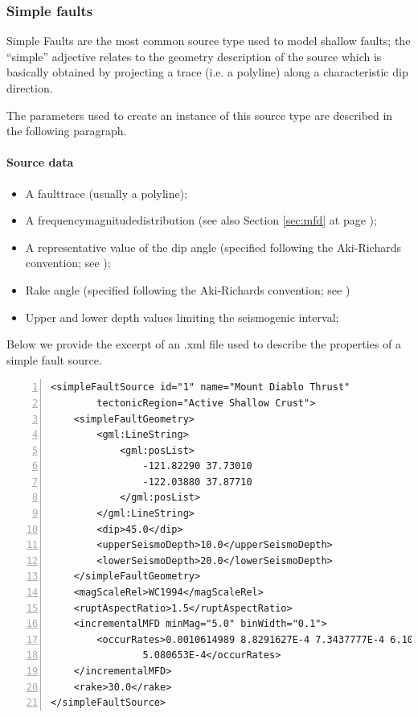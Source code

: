 \subsubsection{Simple faults}
%
Simple Faults are the most common source type used to model shallow 
faults; the ``simple'' adjective relates to the geometry description 
of the source which is basically obtained by projecting a trace 
(i.e. a polyline) along a characteristic dip direction. 

The parameters used to create an instance of this 
source type are described in the following paragraph.
%
\paragraph{Source data}
%
\begin{itemize}
\item A \gls{faulttrace} (usually a polyline); 
\item A \gls{frequencymagnitudedistribution} (see also Section 
    \ref{sec:mfd} at page \pageref{sec:mfd});
\item A representative value of the dip angle (specified following 
the Aki-Richards convention; see \citet{aki2002});
\item Rake angle (specified following the Aki-Richards convention; 
see \citet{aki2002}) 
\item Upper and lower depth values limiting the seismogenic interval; 
\end{itemize}
Below we provide the excerpt of an .xml file used to describe the 
properties of a simple fault source.
\begin{Verbatim}[frame=single, commandchars=\\\{\}, fontsize=\footnotesize,
    numbers=left, numbersep=2pt]
<simpleFaultSource id="1" name="Mount Diablo Thrust" 
		tectonicRegion="Active Shallow Crust">
    <simpleFaultGeometry>
        <gml:LineString>
            <gml:posList>
                -121.82290 37.73010
                -122.03880 37.87710
            </gml:posList>
        </gml:LineString>
        <dip>45.0</dip>
        <upperSeismoDepth>10.0</upperSeismoDepth>
        <lowerSeismoDepth>20.0</lowerSeismoDepth>
    </simpleFaultGeometry>
    <magScaleRel>WC1994</magScaleRel>
    <ruptAspectRatio>1.5</ruptAspectRatio>
    <incrementalMFD minMag="5.0" binWidth="0.1">
        <occurRates>0.0010614989 8.8291627E-4 7.3437777E-4 6.108288E-4 
				5.080653E-4</occurRates>
    </incrementalMFD>
    <rake>30.0</rake>
</simpleFaultSource>
\end{Verbatim}
%
